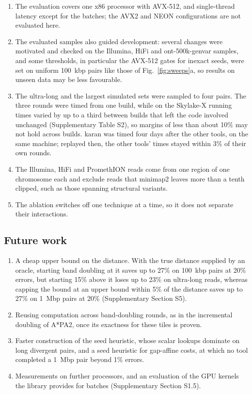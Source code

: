 \begin{enumerate}
  \item The evaluation covers one x86 processor with AVX-512, and single-thread latency except for the batches; the AVX2 and NEON configurations are not evaluated here.
  \item The evaluated samples also guided development: several changes were motivated and checked on the Illumina, HiFi and ont-500k-genvar samples, and some thresholds, in particular the AVX-512 gates for inexact seeds, were set on uniform 100~kbp pairs like those of Fig.~\ref{fig:sweeps}a, so results on unseen data may be less favourable.
  \item The ultra-long and the largest simulated sets were sampled to four pairs. The three rounds were timed from one build, while on the Skylake-X running times varied by up to a third between builds that left the code involved unchanged (Supplementary Table S2), so margins of less than about 10\% may not hold across builds. karan was timed four days after the other tools, on the same machine; replayed then, the other tools' times stayed within 3\% of their own rounds.
  \item The Illumina, HiFi and PromethION reads come from one region of one chromosome each and exclude reads that minimap2 leaves more than a tenth clipped, such as those spanning structural variants.
  \item The ablation switches off one technique at a time, so it does not separate their interactions.
\end{enumerate}

\subsection{Future work}

\begin{enumerate}
  \item A cheap upper bound on the distance. With the true distance supplied by an oracle, starting band doubling at it saves up to 27\% on 100~kbp pairs at 20\% errors, but starting 15\% above it loses up to 23\% on ultra-long reads, whereas capping the bound at an upper bound within 5\% of the distance saves up to 27\% on 1~Mbp pairs at 20\% (Supplementary Section S5).
  \item Reusing computation across band-doubling rounds, as in the incremental doubling of A*PA2, once its exactness for these tiles is proven.
  \item Faster construction of the seed heuristic, whose scalar lookups dominate on long divergent pairs, and a seed heuristic for gap-affine costs, at which no tool completed a 1~Mbp pair beyond 1\% errors.
  \item Measurements on further processors, and an evaluation of the GPU kernels the library provides for batches (Supplementary Section S1.5).
\end{enumerate}
